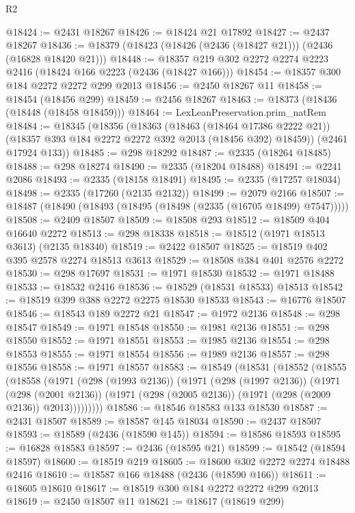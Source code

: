 \begin{lexlean}{R2}
\begin{coremodule}
@18424 := @2431 @18267
@18426 := @18424 @21 @17892
@18427 := @2437 @18267
@18436 := @18379 (@18423 (@18426 (@2436 (@18427 @21))) (@2436 (@16828 @18420 @21)))
@18448 := @18357 @219 @302 @2272 @2274 @2223 @2416 (@18424 @166 @2223 (@2436 (@18427 @166)))
@18454 := @18357 @300 @184 @2272 @2272 @299 @2013
@18456 := @2450 @18267 @11
@18458 := @18454 (@18456 @299)
@18459 := @2456 @18267
@18463 := @18373 (@18436 (@18448 (@18458 @18459)))
@18464 := LexLeanPreservation.prim_natRem
@18484 := @18345
    (@18356
      (@18363
        (@18463 (@18464 @17386 @2222 @21))
        (@18357 @393 @184 @2272 @2272 @392 @2013 (@18456 @392) @18459))
      (@2461 @17924 @133))
@18485 := @298 @18292
@18487 := @2335 (@18264 @18485)
@18488 := @298 @18274
@18490 := @2335 (@18204 @18488)
@18491 := @2241 @2086
@18493 := @2335 (@18158 @18491)
@18495 := @2335 (@17257 @18034)
@18498 := @2335 (@17260 (@2135 @2132))
@18499 := @2079 @2166
@18507 := @18487 (@18490 (@18493 (@18495 (@18498 (@2335 (@16705 @18499) @7547)))))
@18508 := @2409 @18507
@18509 := @18508 @293
@18512 := @18509 @404 @16640 @2272
@18513 := @298 @18338
@18518 := @18512 (@1971 @18513 @3613) (@2135 @18340)
@18519 := @2422 @18507
@18525 := @18519 @402 @395 @2578 @2274 @18513 @3613
@18529 := @18508 @384 @401 @2576 @2272
@18530 := @298 @17697
@18531 := @1971 @18530
@18532 := @1971 @18488
@18533 := @18532 @2416
@18536 := @18529 (@18531 @18533) @18513
@18542 := @18519 @399 @388 @2272 @2275 @18530 @18533
@18543 := @16776 @18507
@18546 := @18543 @189 @2272 @21
@18547 := @1972 @2136
@18548 := @298 @18547
@18549 := @1971 @18548
@18550 := @1981 @2136
@18551 := @298 @18550
@18552 := @1971 @18551
@18553 := @1985 @2136
@18554 := @298 @18553
@18555 := @1971 @18554
@18556 := @1989 @2136
@18557 := @298 @18556
@18558 := @1971 @18557
@18583 := @18549
    (@18531
      (@18552
        (@18555
          (@18558
            (@1971
              (@298 (@1993 @2136))
              (@1971
                (@298 (@1997 @2136))
                (@1971
                  (@298 (@2001 @2136))
                  (@1971 (@298 (@2005 @2136)) (@1971 (@298 (@2009 @2136)) @2013)))))))))
@18586 := @18546 @18583 @133 @18530
@18587 := @2431 @18507
@18589 := @18587 @145 @18034
@18590 := @2437 @18507
@18593 := @18589 (@2436 (@18590 @145))
@18594 := @18586 @18593
@18595 := @16828 @18583
@18597 := @2436 (@18595 @21)
@18599 := @18542 (@18594 @18597)
@18600 := @18519 @219
@18605 := @18600 @302 @2272 @2274 @18488 @2416
@18610 := @18587 @166 @18488 (@2436 (@18590 @166))
@18611 := @18605 @18610
@18617 := @18519 @300 @184 @2272 @2272 @299 @2013
@18619 := @2450 @18507 @11
@18621 := @18617 (@18619 @299)

\end{coremodule}
\end{lexlean}
